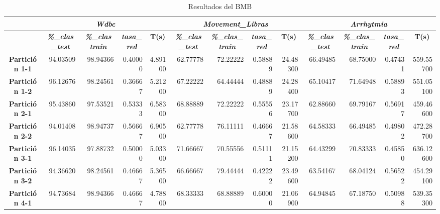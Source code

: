 \documentclass[a4paper,11pt]{article}
\begin{document}
  \begin{table}[H]
  \caption*{Resultados del BMB}
  \begin{adjustbox}{width=1.1\textwidth}
  \begin{tabular}{|c|r|r|r|r|r|r|r|r|r|r|r|r|}
  \hline
  \multicolumn{1}{|l|}{} & \multicolumn{ 4}{c|}{\textbf{\textit{Wdbc}}} & \multicolumn{ 4}{c|}{\textbf{\textit{Movement\_Libras}}} & \multicolumn{ 4}{c|}{\textbf{\textit{Arrhytmia}}} \\ \hline
  \multicolumn{1}{|l|}{} & \multicolumn{1}{c|}{\textbf{\textit{\%\_clas\_test}}} & \multicolumn{1}{c|}{\textbf{\textit{\%\_clas train}}} & \multicolumn{1}{c|}{\textbf{\textit{tasa\_red}}} & \multicolumn{1}{c|}{\textbf{T(s)}} & \multicolumn{1}{c|}{\textbf{\textit{\%\_clas\_test}}} & \multicolumn{1}{c|}{\textbf{\textit{\%\_clas\_train}}} & \multicolumn{1}{c|}{\textbf{\textit{tasa\_red}}} & \multicolumn{1}{c|}{\textbf{T(s)}} & \multicolumn{1}{c|}{\textbf{\textit{\%\_clas\_test}}} & \multicolumn{1}{c|}{\textbf{\textit{\%\_clas\_train}}} & \multicolumn{1}{c|}{\textbf{\textit{tasa\_red}}} & \multicolumn{1}{c|}{\textbf{T(s)}} \\ \hline
  \textbf{Partición 1-1} & 94.03509 & 98.94366 & 0.40000 & 4.89100 & 62.77778 & 72.22222 & 0.58889 & 24.48300 & 66.49485 & 68.75000 & 0.47431 & 559.55700 \\ \hline
  \textbf{Partición 1-2} & 96.12676 & 98.24561 & 0.36667 & 5.21200 & 67.22222 & 64.44444 & 0.48889 & 24.28400 & 65.10417 & 71.64948 & 0.58893 & 551.05100 \\ \hline
  \textbf{Partición 2-1} & 95.43860 & 97.53521 & 0.53333 & 6.58300 & 68.88889 & 72.22222 & 0.55556 & 23.17700 & 62.88660 & 69.79167 & 0.56917 & 459.46600 \\ \hline
  \textbf{Partición 2-2} & 94.01408 & 98.94737 & 0.56667 & 6.90500 & 62.77778 & 76.11111 & 0.46667 & 21.58600 & 64.58333 & 66.49485 & 0.49802 & 472.28700 \\ \hline
  \textbf{Partición 3-1} & 96.14035 & 97.88732 & 0.50000 & 5.03300 & 71.66667 & 70.55556 & 0.51111 & 21.15200 & 64.43299 & 70.83333 & 0.45850 & 636.12600 \\ \hline
  \textbf{Partición 3-2} & 94.36620 & 98.24561 & 0.46667 & 5.36500 & 66.66667 & 79.44444 & 0.42222 & 23.49600 & 63.54167 & 68.04124 & 0.56522 & 454.29100 \\ \hline
  \textbf{Partición 4-1} & 94.73684 & 98.94366 & 0.46667 & 4.78800 & 68.33333 & 68.88889 & 0.60000 & 21.06900 & 64.94845 & 67.18750 & 0.50988 & 539.35300 \\ \hline

\end{tabular}
\end{adjustbox}
\end{table}
\end{document}

